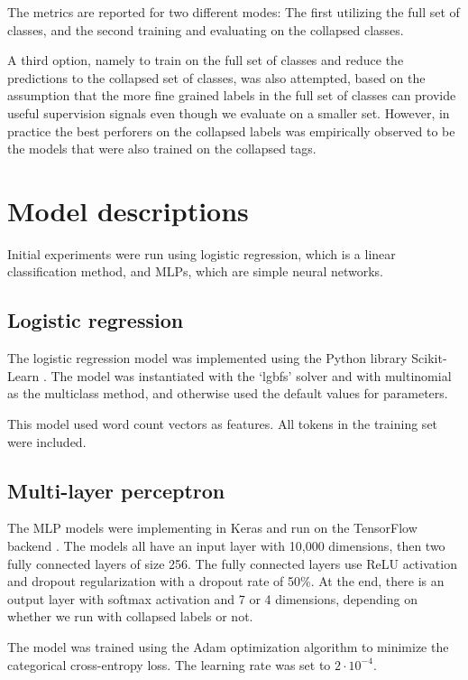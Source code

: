 The metrics are reported for two different modes: The first utilizing the
full set of classes, and the second training and evaluating on the collapsed
classes.

A third option, namely to train on the full set of classes and reduce the
predictions to the collapsed set of classes, was also attempted, based on the
assumption that the more fine grained labels in the full set of classes can
provide useful supervision signals even though we evaluate on a smaller set.
However, in practice the best perforers on the collapsed labels was
empirically observed to be the models that were also trained on the collapsed
tags.

\section{Model descriptions}

Initial experiments were run using logistic regression, which is a linear
classification method, and \acp{MLP}, which are simple neural networks.

\subsection{Logistic regression}

The logistic regression model was implemented using the Python library
Scikit-Learn \autocite{scikit-learn}. The model was instantiated with the
`lgbfs' solver and with multinomial as the multiclass method, and otherwise
used the default values for parameters.

This model used word count vectors as features. All tokens in the training set
were included.

\subsection{Multi-layer perceptron}
\label{subsec:mlp}

The MLP models were implementing in Keras \autocite{keras} and run on the
TensorFlow backend \autocite{tensorflow}. The models all have an input layer
with 10,000 dimensions, then two fully connected layers of size 256. The
fully connected layers use \ac{ReLU} activation and dropout regularization
with a dropout rate of 50\%. At the end, there is an output layer with
softmax activation and 7 or 4 dimensions, depending on whether we run with
collapsed labels or not.

The model was trained using the Adam optimization algorithm to minimize the
categorical cross-entropy loss. The learning rate was set to $2\cdot
10^{-4}$.

